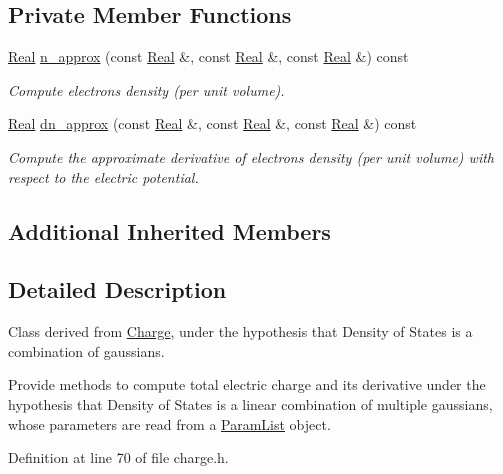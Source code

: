 \subsection*{Private Member Functions}
\begin{DoxyCompactItemize}
\item 
\hyperlink{typedefs_8h_a060b837c3b4486ee35317744156f3da2}{Real} \hyperlink{classGaussianCharge_a91f27044b2f7ced7c2330153bb9da652}{n\-\_\-approx} (const \hyperlink{typedefs_8h_a060b837c3b4486ee35317744156f3da2}{Real} \&, const \hyperlink{typedefs_8h_a060b837c3b4486ee35317744156f3da2}{Real} \&, const \hyperlink{typedefs_8h_a060b837c3b4486ee35317744156f3da2}{Real} \&) const 
\begin{DoxyCompactList}\small\item\em Compute electrons density (per unit volume). \end{DoxyCompactList}\item 
\hyperlink{typedefs_8h_a060b837c3b4486ee35317744156f3da2}{Real} \hyperlink{classGaussianCharge_ab5ce245792f1b0d7c2038ebc75bbc758}{dn\-\_\-approx} (const \hyperlink{typedefs_8h_a060b837c3b4486ee35317744156f3da2}{Real} \&, const \hyperlink{typedefs_8h_a060b837c3b4486ee35317744156f3da2}{Real} \&, const \hyperlink{typedefs_8h_a060b837c3b4486ee35317744156f3da2}{Real} \&) const 
\begin{DoxyCompactList}\small\item\em Compute the approximate derivative of electrons density (per unit volume) with respect to the electric potential. \end{DoxyCompactList}\end{DoxyCompactItemize}
\subsection*{Additional Inherited Members}


\subsection{Detailed Description}
Class derived from \hyperlink{classCharge}{Charge}, under the hypothesis that Density of States is a combination of gaussians. 

Provide methods to compute total electric charge and its derivative under the hypothesis that Density of States is a linear combination of multiple gaussians, whose parameters are read from a \hyperlink{classParamList}{Param\-List} object. 

Definition at line 70 of file charge.\-h.



